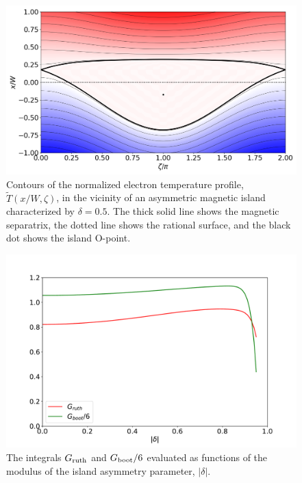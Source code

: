 \documentclass{iopjournal}
\begin{document}
\begin{figure}
\centerline{\includegraphics[width=\textwidth]{Fig7.png}}
\caption{Contours of the normalized electron temperature profile, $\tilde{T}(x/W,\zeta)$, in the vicinity of an asymmetric magnetic island  characterized by
$\delta = 0.5$. The thick solid line shows the magnetic separatrix, the dotted line shows the rational surface, and the black dot shows the
island O-point.\label{fig5}}
\end{figure}

\begin{figure}
\centerline{\includegraphics[width=\textwidth]{Fig8.pdf}}
\caption{The integrals $G_{\rm ruth}$ and $G_{\rm boot}/6$ evaluated as functions of the modulus of the island asymmetry parameter, $|\delta|$.  \label{fig6}}
\end{figure}
\end{document}
